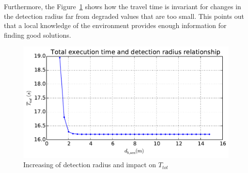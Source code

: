 \documentclass[eprint]{actapoly}
\begin{document}
Furthermore, the Figure~\ref{fig:drhotot} shows how the travel time
is invariant for changes in the detection radius far from degraded values that are too small.
This points out that a local knowledge of the environment provides enough information for finding good solutions.
\begin{figure}[!h]\centering
  \includegraphics[width=\linewidth]{./images/drho/drho-tot.pdf}
  \caption{Increasing of detection radius and impact on
  $T_{tot}$\label{fig:drhotot}}
\end{figure}

%
%
%
\end{document}
